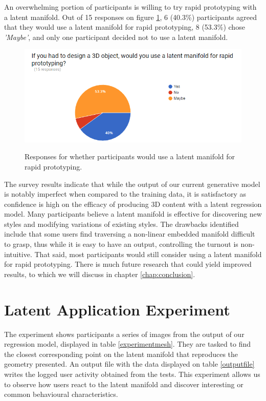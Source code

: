 \documentclass[ %
author={Dillon Keith Diep},
supervisor={Dr. Carl Henrik Ek},
degree={MEng},
title={ART-CG Hair:},
subtitle={Assisted Real-time Content Generation of Stylised Virtual Hair},
type={Research},
year={2017} ]{dissertation}
\begin{document}
An overwhelming portion of participants is willing to try rapid prototyping with a latent manifold. Out of 15 responses on figure \ref{surveyPrototype}, 6 (40.3\%) participants agreed that they would use a latent manifold for rapid prototyping, 8 (53.3\%) chose \textit{'Maybe'}, and only one participant decided not to use a latent manifold. 

\begin{figure}[!h]
	\centering
	\caption{Responses for whether participants would use a latent manifold for rapid prototyping.}
	\includegraphics[scale=0.7]{images/surveyPrototype}
	\label{surveyPrototype}
\end{figure}

The survey results indicate that while the output of our current generative model is notably imperfect when compared to the training data, it is satisfactory as confidence is high on the efficacy of producing 3D content with a latent regression model. Many participants believe a latent manifold is effective for discovering new styles and modifying variations of existing styles. The drawbacks identified include that some users find traversing a non-linear embedded manifold difficult to grasp, thus while it is easy to have an output, controlling the turnout is non-intuitive. That said, most participants would still consider using a latent manifold for rapid prototyping. There is much future research that could yield improved results, to which we will discuss in chapter \ref{chap:conclusion}.

\section{Latent Application Experiment}
\label{evaluation:experiment}
The experiment shows participants a series of images from the output of our regression model, displayed in table \ref{experimentmesh}. They are tasked to find the closest corresponding point on the latent manifold that reproduces the geometry presented. An output file with the data displayed on table \ref{outputfile} writes the logged user activity obtained from the tests. This experiment allows us to observe how users react to the latent manifold and discover interesting or common behavioural characteristics.
\end{document}
